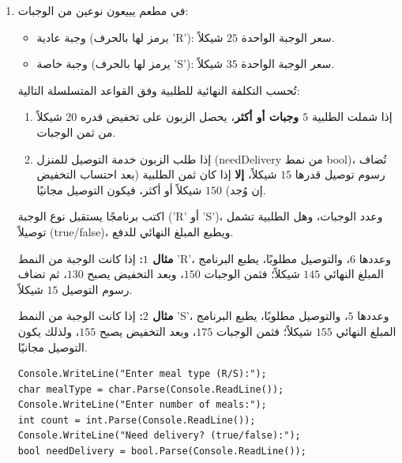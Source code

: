 \documentclass[14pt]{extarticle}
\begin{document}
\begin{enumerate}[resume, itemsep=2.2em]
\begin{boxSolution}
\begin{english}
\begin{verbatim}
double cost;
if (zone == 'L')
{
    if (weight <= 5)
    {
        cost = 25;
    }
    else
    {
        cost = 25 + (weight - 5) * 4;
    }
}
else
{
    if (weight <= 5)
    {
        cost = 80;
    }
    else
    {
        cost = 80 + (weight - 5) * 15;
    }
}
Console.WriteLine("Shipping cost: " + cost);
\end{verbatim}
\end{english}
\end{boxSolution}
\fi
\filbreak

\item
في مطعم يبيعون نوعين من الوجبات:
\begin{itemize}[nosep]
    \item وجبة عادية (يرمز لها بالحرف \textenglish{'R'}): سعر الوجبة الواحدة $25$ شيكلاً.
    \item وجبة خاصة (يرمز لها بالحرف \textenglish{'S'}): سعر الوجبة الواحدة $35$ شيكلاً.
\end{itemize}
تُحسب التكلفة النهائية للطلبية وفق القواعد المتسلسلة التالية:
\begin{enumerate}[nosep]
    \item إذا شملت الطلبية \textbf{$5$ وجبات أو أكثر}، يحصل الزبون على تخفيض قدره $20$ شيكلاً من ثمن الوجبات.
    \item إذا طلب الزبون خدمة التوصيل للمنزل (\textenglish{needDelivery} من نمط \textenglish{bool})، تُضاف رسوم توصيل قدرها $15$ شيكلاً، \textbf{إلا} إذا كان ثمن الطلبية (بعد احتساب التخفيض إن وُجد) $150$ شيكلاً أو أكثر، فيكون التوصيل مجانيًا.
\end{enumerate}
اكتب برنامجًا يستقبل نوع الوجبة (\textenglish{'R'} أو \textenglish{'S'})، وعدد الوجبات، وهل الطلبية تشمل توصيلاً (\textenglish{true/false})، ويطبع المبلغ النهائي للدفع.

\textbf{مثال $1$:} إذا كانت الوجبة من النمط \textenglish{'R'}، وعددها $6$، والتوصيل مطلوبًا، يطبع البرنامج المبلغ النهائي $145$ شيكلاً؛ فثمن الوجبات $150$، وبعد التخفيض يصبح $130$، ثم تضاف رسوم التوصيل $15$ شيكلاً.

\textbf{مثال $2$:} إذا كانت الوجبة من النمط \textenglish{'S'}، وعددها $5$، والتوصيل مطلوبًا، يطبع البرنامج المبلغ النهائي $155$ شيكلاً؛ فثمن الوجبات $175$، وبعد التخفيض يصبح $155$، ولذلك يكون التوصيل مجانيًا.

\ifwithsols
\begin{boxSolution}
\begin{english}
\begin{verbatim}
Console.WriteLine("Enter meal type (R/S):");
char mealType = char.Parse(Console.ReadLine());
Console.WriteLine("Enter number of meals:");
int count = int.Parse(Console.ReadLine());
Console.WriteLine("Need delivery? (true/false):");
bool needDelivery = bool.Parse(Console.ReadLine());


\end{verbatim}
\end{english}
\end{boxSolution}
\end{enumerate}
\end{document}

